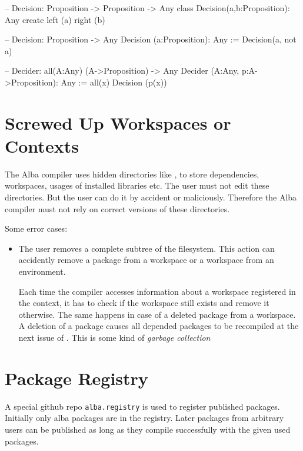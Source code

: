 \begin{alba}
  -- Decision: Proposition -> Proposition -> Any
  class
    Decision(a,b:Proposition): Any
  create
    left  (a)
    right (b)

  -- Decision: Proposition -> Any
  Decision (a:Proposition): Any
    := Decision(a, not a)

  -- Decider: all(A:Any) (A->Proposition) -> Any
  Decider (A:Any, p:A->Proposition): Any
    := all(x) Decision (p(x))
\end{alba}







\section{Screwed Up Workspaces or Contexts}

The Alba compiler uses hidden directories like ,
 to store dependencies, workspaces, usages of installed
libraries etc. The user must not edit these directories. But the user can do
it by accident or maliciously. Therefore the Alba compiler must not rely on
correct versions of these directories.

Some error cases:
\begin{itemize}

\item The user removes a complete subtree of the filesystem. This action can
  accidently remove a package from a workspace or a workspace from an
  environment.

  Each time the compiler accesses information about a workspace registered in
  the context, it has to check if the workspace still exists and remove it
  otherwise. The same happens in case of a deleted package from a workspace. A
  deletion of a package causes all depended packages to be recompiled at the
  next issue of . This is some kind of \emph{garbage
    collection}


\end{itemize}



\section{Package Registry}

A special github repo \verb|alba.registry| is used to register published
packages. Initially only alba packages are in the registry. Later packages
from arbitrary users can be published as long as they compile successfully
with the given used packages.

